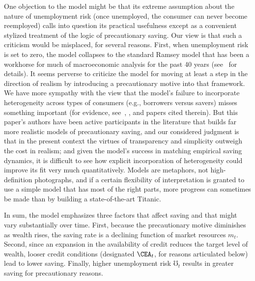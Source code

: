 \documentclass[titlepage]{\econtex}
\begin{document}
\begin{comment}
\begin{figure}
\caption{Increase in Unemployment Risk}\label{fig:cBeforeAndAfteruRise}
\texttt{[image: \\econtexRoot/Figures/cBeforeAndAfteruRise]}
\end{figure}
\end{comment}

One objection to the model might be that its extreme assumption about
the nature of unemployment risk (once unemployed, the consumer can
never become reemployed) calls into question its practical usefulness
except as a convenient stylized treatment of the logic of
precautionary saving.  Our view is that such a criticism would be
misplaced, for several reasons.  First, when unemployment risk is set
to zero, the model collapses to the standard Ramsey model that has
been a workhorse for much of macroeconomic analysis for the past 40
years (see~\cite{ctDiscrete} for details).  It seems perverse to
criticize the model for moving at least a step in the direction of
realism by introducing a precautionary motive into that framework.  We
have more sympathy with the view that the model's failure to
incorporate heterogeneity across types of consumers (e.g., borrowers
versus savers) misses something important (for evidence,
see~\cite{dynan_debtOverhang}, \cite{mrsBalance}, and papers cited
therein).  But this paper's authors have been active participants in
the literature that builds far more realistic models of precautionary
saving, and our considered judgment is that in the present context the
virtues of transparency and simplicity outweigh the cost in realism;
and given the model's success in matching empirical saving dynamics,
it is difficult to see how explicit incorporation of heterogeneity
could improve its fit very much quantitatively.  Models are metaphors,
not high-definition photographs, and if a certain flexibility of
interpretation is granted to use a simple model that has most of the
right parts, more progress can sometimes be made than by building a
state-of-the-art Titanic.

In sum, the model emphasizes three factors that affect saving and that might vary substantially over time.  First, because the precautionary motive diminishes as wealth rises, the saving rate is a declining function of market resources $m_{t}$.  Second, since an expansion in the availability of credit reduces the target level of wealth, looser credit conditions (designated $\CEA_t$, for reasons articulated below) lead to lower saving.  Finally, higher unemployment risk $\mho_t$ results in greater saving for precautionary reasons.
\end{document}
